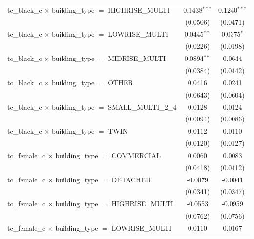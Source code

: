 \begin{tabular}{lcc}
   tc\_black\_c $\times$ building\_type $=$ HIGHRISE\_MULTI            & 0.1438$^{***}$ & 0.1240$^{***}$\\   
                                                                       & (0.0506)       & (0.0471)\\   
   tc\_black\_c $\times$ building\_type $=$ LOWRISE\_MULTI             & 0.0445$^{**}$  & 0.0375$^{*}$\\   
                                                                       & (0.0226)       & (0.0198)\\   
   tc\_black\_c $\times$ building\_type $=$ MIDRISE\_MULTI             & 0.0894$^{**}$  & 0.0644\\   
                                                                       & (0.0384)       & (0.0442)\\   
   tc\_black\_c $\times$ building\_type $=$ OTHER                      & 0.0416         & 0.0241\\   
                                                                       & (0.0643)       & (0.0604)\\   
   tc\_black\_c $\times$ building\_type $=$ SMALL\_MULTI\_2\_4         & 0.0128         & 0.0124\\   
                                                                       & (0.0094)       & (0.0086)\\   
   tc\_black\_c $\times$ building\_type $=$ TWIN                       & 0.0112         & 0.0110\\   
                                                                       & (0.0120)       & (0.0127)\\   
   tc\_female\_c $\times$ building\_type $=$ COMMERCIAL                & 0.0060         & 0.0083\\   
                                                                       & (0.0418)       & (0.0412)\\   
   tc\_female\_c $\times$ building\_type $=$ DETACHED                  & -0.0079        & -0.0041\\   
                                                                       & (0.0341)       & (0.0347)\\   
   tc\_female\_c $\times$ building\_type $=$ HIGHRISE\_MULTI           & -0.0553        & -0.0959\\   
                                                                       & (0.0762)       & (0.0756)\\   
   tc\_female\_c $\times$ building\_type $=$ LOWRISE\_MULTI            & 0.0110         & 0.0167\\   

\end{tabular}
